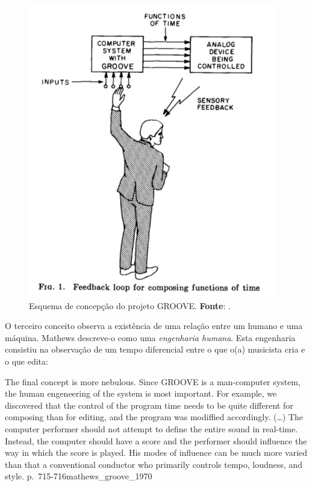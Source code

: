 \begin{figure}
\begin{center}
\includegraphics[scale=0.618]{./imagens/GROOVE.png}
\caption{Esquema de concepção do projeto GROOVE. \textbf{Fonte}: \cite{mathews_groove_1970}.}
\label{fig:groove_sistema}
\end{center}
\end{figure} 

O terceiro conceito observa a existência de uma relação entre um humano e uma máquina. Mathews descreve-o como uma \emph{engenharia humana}. Esta engenharia consistiu na observação de um tempo diferencial entre o que o(a) musicista cria e o que edita:

{
The final concept is more nebulous. Since GROOVE is a man-computer system, the human engeneering of the system is most important. For example, we discovered that the control of the program time needs to be quite different for composing than for editing, and the program was modiffied accordingly. (\ldots) The computer performer should not attempt to define the entire sound in real-time. Instead, the computer should have a score and the performer should influence the way in which the score is played. His modes of influence can be much more varied than that a conventional conductor who primarily controls tempo, loudness, and style.
}
{p.~715-716}{mathews_groove_1970}



